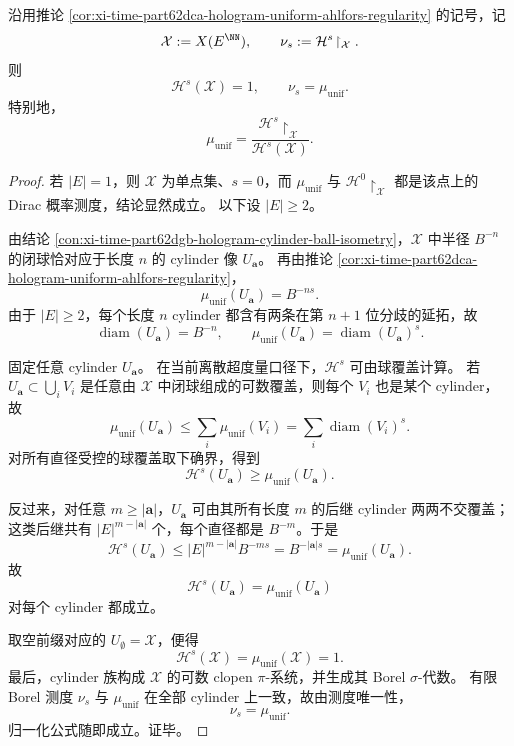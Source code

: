 \begin{corollary}\label{cor:xi-time-part62dca-hologram-hausdorff-measure-identification}
沿用推论 \ref{cor:xi-time-part62dca-hologram-uniform-ahlfors-regularity} 的记号，记
\[
\mathcal X:=X(E^{\NN}),
\qquad
\nu_s:=\mathcal H^s\!\restriction_{\mathcal X}.
\]
则
\[
\mathcal H^s(\mathcal X)=1,
\qquad
\nu_s=\mu_{\mathrm{unif}}.
\]
特别地，
\[
\mu_{\mathrm{unif}}
=
\frac{\mathcal H^s\!\restriction_{\mathcal X}}{\mathcal H^s(\mathcal X)}.
\]
\end{corollary}
\begin{proof}
若 \(|E|=1\)，则 \(\mathcal X\) 为单点集、\(s=0\)，而 \(\mu_{\mathrm{unif}}\) 与 \(\mathcal H^0\!\restriction_{\mathcal X}\) 都是该点上的 Dirac 概率测度，结论显然成立。
以下设 \(|E|\ge 2\)。

由结论 \ref{con:xi-time-part62dgb-hologram-cylinder-ball-isometry}，\(\mathcal X\) 中半径 \(B^{-n}\) 的闭球恰对应于长度 \(n\) 的 cylinder 像 \(U_{\mathbf a}\)。
再由推论 \ref{cor:xi-time-part62dca-hologram-uniform-ahlfors-regularity}，
\[
\mu_{\mathrm{unif}}(U_{\mathbf a})=B^{-ns}.
\]
由于 \(|E|\ge 2\)，每个长度 \(n\) cylinder 都含有两条在第 \(n+1\) 位分歧的延拓，故
\[
\operatorname{diam}(U_{\mathbf a})=B^{-n},
\qquad
\mu_{\mathrm{unif}}(U_{\mathbf a})=\operatorname{diam}(U_{\mathbf a})^s.
\]

固定任意 cylinder \(U_{\mathbf a}\)。
在当前离散超度量口径下，\(\mathcal H^s\) 可由球覆盖计算。
若 \(U_{\mathbf a}\subset \bigcup_i V_i\) 是任意由 \(\mathcal X\) 中闭球组成的可数覆盖，则每个 \(V_i\) 也是某个 cylinder，故
\[
\mu_{\mathrm{unif}}(U_{\mathbf a})
\le
\sum_i \mu_{\mathrm{unif}}(V_i)
=
\sum_i \operatorname{diam}(V_i)^s.
\]
对所有直径受控的球覆盖取下确界，得到
\[
\mathcal H^s(U_{\mathbf a})\ge \mu_{\mathrm{unif}}(U_{\mathbf a}).
\]

反过来，对任意 \(m\ge |\mathbf a|\)，\(U_{\mathbf a}\) 可由其所有长度 \(m\) 的后继 cylinder 两两不交覆盖；这类后继共有 \(|E|^{m-|\mathbf a|}\) 个，每个直径都是 \(B^{-m}\)。于是
\[
\mathcal H^s(U_{\mathbf a})
\le
|E|^{m-|\mathbf a|}B^{-ms}
=
B^{-|\mathbf a|s}
=
\mu_{\mathrm{unif}}(U_{\mathbf a}).
\]
故
\[
\mathcal H^s(U_{\mathbf a})=\mu_{\mathrm{unif}}(U_{\mathbf a})
\]
对每个 cylinder 都成立。

取空前缀对应的 \(U_{\emptyset}=\mathcal X\)，便得
\[
\mathcal H^s(\mathcal X)=\mu_{\mathrm{unif}}(\mathcal X)=1.
\]
最后，cylinder 族构成 \(\mathcal X\) 的可数 clopen \(\pi\)-系统，并生成其 Borel \(\sigma\)-代数。
有限 Borel 测度 \(\nu_s\) 与 \(\mu_{\mathrm{unif}}\) 在全部 cylinder 上一致，故由测度唯一性，
\[
\nu_s=\mu_{\mathrm{unif}}.
\]
归一化公式随即成立。证毕。
\end{proof}

